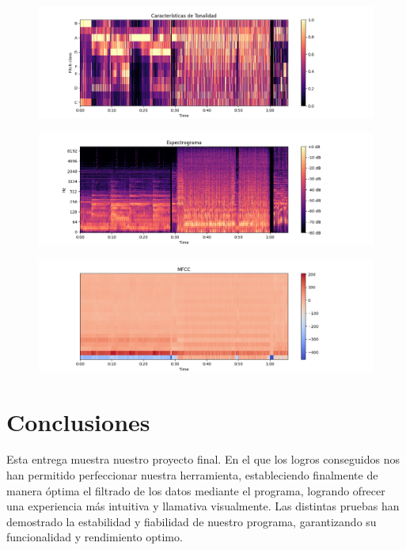 \documentclass[letterpaper, 12pt]{article}
\begin{document}
\begin{figure}[H]
	\begin{center}
		\includegraphics[width=\linewidth]{Images/testTonality.png}
		\caption{}
	\end{center}
\end{figure}

\begin{figure}[H]
	\begin{center}
		\includegraphics[width=\linewidth]{Images/testSpectogram.png}
		\caption{}
	\end{center}
\end{figure}

\begin{figure}[H]
	\begin{center}
		\includegraphics[width=\linewidth]{Images/testMFCC.png}
		\caption{}
	\end{center}
\end{figure}

\section*{Conclusiones}

Esta entrega muestra nuestro proyecto final. En el que los
logros conseguidos nos han permitido perfeccionar nuestra
herramienta, estableciendo finalmente de manera óptima el
filtrado de los datos mediante el programa, logrando
ofrecer una experiencia más intuitiva y llamativa
visualmente. Las distintas pruebas han demostrado la
estabilidad y fiabilidad de nuestro programa, garantizando
su funcionalidad y rendimiento optimo.

\nocite{source_code}

\printbibliography
\end{document}
